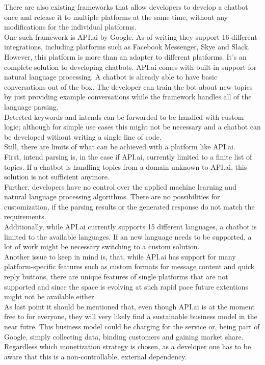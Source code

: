 There are also existing frameworks that allow developers to develop a chatbot once and release it to multiple platforms at the same time, without any modifications for the individual platforms.
\\
One such framework is API.ai by Google. As of writing they support 16 different integrations, including platforms such as Facebook Messenger, Skye and Slack\cite{apiai}. However, this platform is more than an adapter to different platforms. It's an complete solution to developing chatbots. API.ai comes with built-in support for natural language processing. A chatbot is already able to have basic conversations out of the box. The developer can train the bot about new topics by just providing example conversations while the framework handles all of the language parsing.
\\
Detected keywords and intends can be forwarded to be handled with custom logic; although for simple use cases this might not be necessary and a chatbot can be developed without writing a single line of code.
\\

Still, there are limits of what can be achieved with a platform like API.ai.
\\
First, intend parsing is, in the case if API.ai, currently limited to a finite list of topics. If a chatbot is handling topics from a domain unknown to API.ai, this solution is not sufficient anymore.
\\
Further, developers have no control over the applied machine learning and natural language processing algorithms.
There are no possibilities for customization, if the parsing results or the generated response do not match the requirements.
\\
Additionally, while API.ai currently supports 15 different languages, a chatbot is limited to the available languages.
If an new language needs to be supported, a lot of work might be necessary switching to a custom solution.
\\
Another issue to keep in mind is, that, while API.ai has support for many platform-specific features such as custom formats for message content and quick reply buttons, there are unique features of single platforms that are not supported and since the space is evolving at such rapid pace future extentions might not be available either.
\\
As last point it should be mentioned that, even though API.ai is at the moment free to for everyone, they will very likely find a sustainable business model in the near futre. This business model could be charging for the service or, being part of Google, simply collecting data, binding customers and gaining market share. Regardless which monetization strategy is chosen, as a developer one has to be aware that this is a non-controllable, external dependency.
